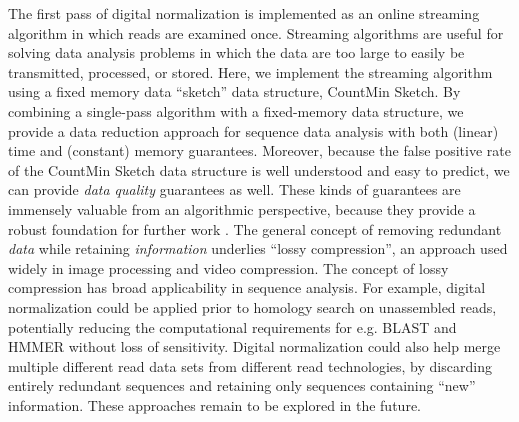 The first pass of digital normalization is implemented as an online
streaming algorithm in which reads are examined once.  Streaming
algorithms are useful for solving data analysis problems in which
the data are too large to easily be transmitted, processed, or
stored.  Here, we implement the streaming algorithm using a fixed
memory data ``sketch'' data structure, CountMin Sketch.  By combining
a single-pass algorithm with a fixed-memory data structure, we provide
a data reduction approach for sequence data analysis with both
(linear) time and (constant) memory guarantees. Moreover, because the
false positive rate of the CountMin Sketch data structure is well
understood and easy to predict, we can provide {\em data quality}
guarantees as well.  These kinds of guarantees are immensely
valuable from an algorithmic perspective, because they provide a
robust foundation for further work \cite{muthukrishnan2005data}.
%
The general concept of removing redundant {\em data} while retaining
{\em information} underlies ``lossy compression'', an approach used
widely in image processing and video compression.  The concept of
lossy compression has broad applicability in sequence analysis.
For example, digital normalization could be applied prior to homology
search on unassembled reads, potentially reducing the computational
requirements for e.g. BLAST and HMMER without loss of sensitivity.
Digital normalization could also help merge multiple different read
data sets from different read technologies, by discarding
entirely redundant sequences and retaining only sequences containing
``new'' information.  These approaches remain to be explored in the future.





